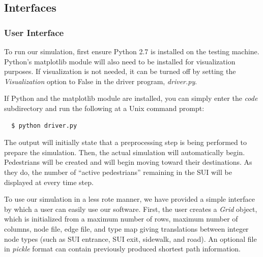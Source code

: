 \documentclass[12pt]{article}
\begin{document}
\subsection{Interfaces}

\subsubsection{User Interface}

To run our simulation, first ensure Python 2.7 is installed on the testing
machine. Python's matplotlib module will also need to be installed for
visualization purposes. If visualization is not needed, it can be turned
off by setting the \textit{Visualization} option to False in the driver program,
\textit{driver.py}.

If Python and the matplotlib module are installed, you can simply enter the
\textit{code} subdirectory and run the following at a Unix command prompt:

\begin{lstlisting}
  $ python driver.py
\end{lstlisting}

The output will initially state that a preprocessing step is being performed
to prepare the simulation. Then, the actual simulation will automatically begin.
Pedestrians will be created and will begin moving toward their destinations. As
they do, the number of ``active pedestrians'' remaining in the SUI will be
displayed at every time step.

To use our simulation in a less rote manner, we have provided a simple interface
by which a user can easily use our software. First, the user creates a
\textit{Grid} object, which is initialized from a maximum number of rows,
maximum number of columns, node file, edge file, and type map giving
translations between integer node types (such as SUI entrance, SUI exit,
sidewalk, and road). An optional file in \textit{pickle} format can contain
previously produced shortest path information.
\end{document}
